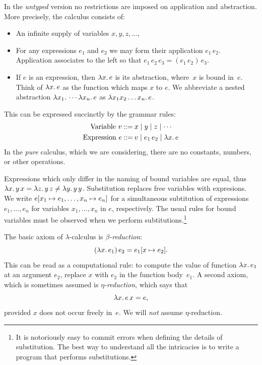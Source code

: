 In the \emph{untyped} version no restrictions are imposed on
application and abstraction. More precisely, the calculus consists of:
%
\begin{itemize}
\item An infinite supply of variables $x, y, z, \ldots$,
\item For any expressions $e_1$ and $e_2$ we may form their
  application $e_1\, e_2$. Application associates to the left so that
  $e_1\, e_2\, e_3 = (e_1\, e_2)\, e_3$.
\item If $e$ is an expression, then $\lambda x .\,e$ is its abstraction,
  where~$x$ is bound in~$e$. Think of $\lambda x .\,e$ as the function
  which maps $x$ to $e$. We abbreviate a nested abstraction
  $\lambda x_1 .\,\cdots \lambda x_n .\,e$ as $\lambda x_1 x_2 \ldots x_n .\,e$.
\end{itemize}
%
This can be expressed succinctly by the grammar rules:
%
\begin{align*}
  \text{Variable}\ v &\mathbin{{:}{:}{=}} x \mid y \mid z \mid \cdots \\
  \text{Expression}\ e &\mathbin{{:}{:}{=}} v \mid e_1\,e_2 \mid \lambda x .\,e
\end{align*}
%
In the \emph{pure} calculus, which we are considering, there are no
constants, numbers, or other operations.

Expressions which only differ in the naming of bound variables are
equal, thus $\lambda x .\,y\, x = \lambda z .\,y\, z \neq \lambda y .\,y\,
  y$. Substitution replaces free variables with expresions. We write
$e[x_1 \mapsto e_1, \ldots, x_n \mapsto e_n]$ for a
simultaneous subtitution of expressions $e_1, \ldots, e_n$ for
variables $x_1, \ldots, x_n$ in $e$, respectively. The usual rules for
bound variables must be observed when we perform
subtitutions.\footnote{It is notoriously easy to commit errors when
  defining the details of substitution. The best way to understand all
  the intricacies is to write a program that performs substitutions.}

The basic axiom of $\lambda$-calculus is \emph{$\beta$-reduction}:
%
\begin{equation*}
  (\lambda x .\,e_1)\, e_2 = e_1[x \mapsto e_2].
\end{equation*}
%
This can be read as a computational rule: to compute the value of
function $\lambda x .\,e_1$ at an argument $e_2$, replace $x$ with $e_2$
in the function body~$e_1$. A second axiom, which is sometimes assumed
is \emph{$\eta$-reduction}, which says that
%
\begin{equation*}
  \lambda x .\,e\, x = e,
\end{equation*}
%
provided $x$ does not occur freely in~$e$. We will \emph{not} assume
$\eta$-reduction.


